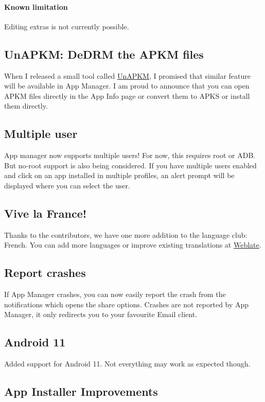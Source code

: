 \paragraph{Known limitation} Editing extras is not currently possible.

\subsection{UnAPKM: DeDRM the APKM files}\label{subsec:unapkm:-dedrm-the-apkm-files}
When I released a small tool called \href{https://f-droid.org/en/packages/io.github.muntashirakon.unapkm}{UnAPKM},
I promised that similar feature will be available in App Manager. I am proud to announce that you can open APKM files
directly in the App Info page or convert them to APKS or install them directly.

\subsection{Multiple user}\label{subsec:multiple-user}
App manager now supports multiple users! For now, this requires root or ADB. But no-root support is also being
considered. If you have multiple users enabled and click on an app installed in multiple profiles, an alert prompt will
be displayed where you can select the user.

\subsection{Vive la France!}
Thanks to the contributors, we have one more addition to the language club: French. You can add more languages or
improve existing translations at \href{https://hosted.weblate.org/engage/app-manager}{Weblate}.

\subsection{Report crashes}
If App Manager crashes, you can now easily report the crash from the notifications which opens the share options.
Crashes are not reported by App Manager, it only redirects you to your favourite Email client.

\subsection{Android 11}
Added support for Android 11. Not everything may work as expected though.

\subsection{App Installer Improvements}

